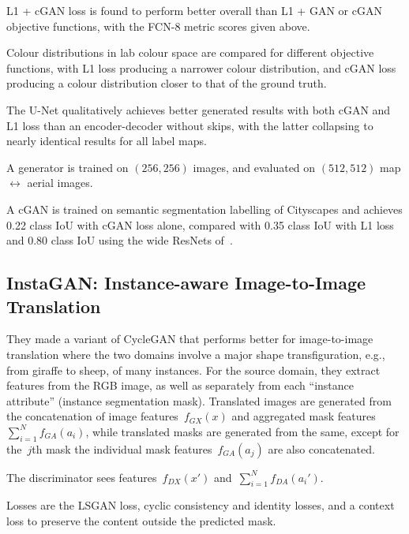 \documentclass[a4paper, 12pt]{article}
\begin{document}

L1 + cGAN loss is found to perform better overall than L1 + GAN or cGAN
objective functions, with the FCN-8 metric scores given above.

Colour distributions in lab colour space are compared for different objective
functions, with L1 loss producing a narrower colour distribution, and cGAN loss
producing a colour distribution closer to that of the ground truth.

The U-Net qualitatively achieves better generated results with both cGAN and L1
loss than an encoder-decoder without skips, with the latter collapsing to
nearly identical results for all label maps.

A generator is trained on $(256, 256)$ images, and evaluated on $(512, 512)$
map $\leftrightarrow$ aerial images.

A cGAN is trained on semantic segmentation labelling of
Cityscapes\citet{DBLP:journals/corr/CordtsORREBFRS16} and achieves 0.22 class
IoU with cGAN loss alone, compared with 0.35 class IoU with L1 loss and 0.80
class IoU using the wide ResNets of~\citet{DBLP:journals/corr/WuSH16e}.


\subsection{InstaGAN: Instance-aware Image-to-Image
            Translation~\cite{mo2019instagan}}

They made a variant of CycleGAN that performs better for image-to-image
translation where the two domains involve a major shape transfiguration, e.g.,
from giraffe to sheep, of many instances.
For the source domain, they extract features from the RGB image, as well as
separately from each ``instance attribute'' (instance segmentation mask).
Translated images are generated from the concatenation of image
features~$f_{GX}(x)$ and aggregated mask features~$\sum_{i = 1}^N f_{GA}(a_i)$,
while translated masks are generated from the same, except for the~$j$th mask
the individual mask features~$f_{GA}(a_j)$ are also concatenated.

The discriminator sees features~$f_{DX}(x')$ and~$\sum_{i = 1}^N f_{DA}(a_i')$.

Losses are the LSGAN loss, cyclic consistency and identity losses, and a
context loss to preserve the content outside the predicted mask.
\end{document}
